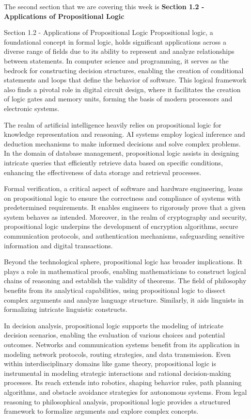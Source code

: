 The second section that we are covering this week is \textbf{Section 1.2 - Applications of Propositional Logic}

\begin{notes}{Section 1.2 - Applications of Propositional Logic}
    Propositional logic, a foundational concept in formal logic, holds significant applications across a diverse range of fields due to its ability to represent and analyze relationships between statements. In computer science 
    and programming, it serves as the bedrock for constructing decision structures, enabling the creation of conditional statements and loops that define the behavior of software. This logical framework also finds a pivotal role 
    in digital circuit design, where it facilitates the creation of logic gates and memory units, forming the basis of modern processors and electronic systems.

    The realm of artificial intelligence heavily relies on propositional logic for knowledge representation and reasoning. AI systems employ logical inference and deduction mechanisms to make informed decisions and solve complex 
    problems. In the domain of database management, propositional logic assists in designing intricate queries that efficiently retrieve data based on specific conditions, enhancing the effectiveness of data storage and retrieval 
    processes.

    Formal verification, a critical aspect of software and hardware engineering, leans on propositional logic to ensure the correctness and compliance of systems with predetermined requirements. It enables engineers to rigorously 
    prove that a given system behaves as intended. Moreover, in the realm of cryptography and security, propositional logic underpins the development of encryption algorithms, secure communication protocols, and authentication 
    mechanisms, safeguarding sensitive information and digital transactions.

    Beyond the technological sphere, propositional logic has broader implications. It plays a role in mathematical proofs, enabling mathematicians to construct logical chains of reasoning and establish the validity of theorems. 
    The field of philosophy benefits from its analytical capabilities, using propositional logic to dissect complex arguments and analyze language structure. Similarly, it aids linguists in formalizing intricate linguistic constructs. 

    In decision analysis, propositional logic supports the modeling of intricate decision scenarios, enabling the evaluation of various choices and potential outcomes. Networks and communication systems benefit from its application 
    in modeling network protocols, routing strategies, and data transmission. Even within interdisciplinary domains like game theory, propositional logic is instrumental in modeling strategic interactions and rational decision-making 
    processes. Its reach extends into robotics, shaping behavior rules, path planning algorithms, and obstacle avoidance strategies for autonomous systems. From legal reasoning to philosophical analysis, propositional logic provides 
    a structured framework to formalize arguments and explore complex concepts.


\end{notes}
